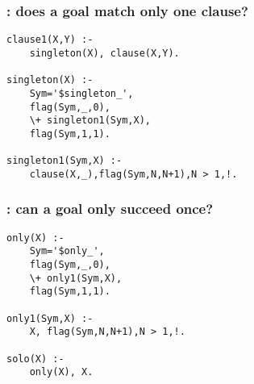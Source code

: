 \subsubsection{ : does a goal match only one clause? }\begin{Verbatim}
clause1(X,Y) :- 
    singleton(X), clause(X,Y).

singleton(X) :-
    Sym='$singleton_',
    flag(Sym,_,0),
    \+ singleton1(Sym,X),
    flag(Sym,1,1).

singleton1(Sym,X) :- 
    clause(X,_),flag(Sym,N,N+1),N > 1,!.
\end{Verbatim}
\subsubsection{ : can a goal  only  succeed once? }\begin{Verbatim}
only(X) :-
    Sym='$only_',
    flag(Sym,_,0),
    \+ only1(Sym,X),
    flag(Sym,1,1).

only1(Sym,X) :- 
    X, flag(Sym,N,N+1),N > 1,!.

solo(X) :- 
    only(X), X.
\end{Verbatim}

